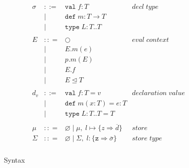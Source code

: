 \documentclass{llncs}
\numberwithin{subcase}{case}
\numberwithin{case}{theorem}
\numberwithin{case}{lemma}
\begin{document}
\begin{figure}[h]
\[\begin{array}{lll}
\begin{array}{lllr}
&&\\
\sigma & ::= & \texttt{val} \; f:T & decl \; type\\
       & |   & \texttt{def} \; m:T \rightarrow T \\
		 & |   & \texttt{type} \; L : T .. T &\\
&&\\
E & :: = & \bigcirc & eval \; context\\
       & | & E.m(e)\\
       & | & p.m(E)\\
       & | & E.f\\
       & | & E \unlhd T\\
&&\\
d_v & ::= & \texttt{val} \; f : T = v & declaration \; value \\
  & |   & \texttt{def} \; m(x:T) = e : T &\\
  & |   & \texttt{type} \; L : T .. T = T &\\
&&\\
\mu & :: = & \varnothing \; | \; \mu,\; l \mapsto \{z \Rightarrow \overline{d}\} & store \\
\Sigma & :: = & \varnothing \; | \; \Sigma,\; l : \{\texttt{z} \Rightarrow \overline{\sigma}\} & store \; type \\
\end{array}
\end{array}
\]
\caption{Syntax}
\label{f:syntax}
\end{figure}
\end{document}
